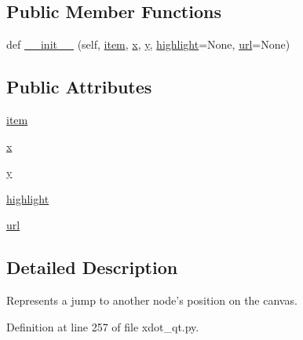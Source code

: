 \subsection*{Public Member Functions}
\begin{DoxyCompactItemize}
\item 
def \hyperlink{classsmacc__viewer_1_1xdot_1_1xdot__qt_1_1Jump_ad88ca98883d1fca0780fca9c5964c081}{\+\_\+\+\_\+init\+\_\+\+\_\+} (self, \hyperlink{classsmacc__viewer_1_1xdot_1_1xdot__qt_1_1Jump_a1bc47eb940a7b69fab6a896feba4942b}{item}, \hyperlink{classsmacc__viewer_1_1xdot_1_1xdot__qt_1_1Jump_a165dd6595f012b5dfaa5a9e72891313c}{x}, \hyperlink{classsmacc__viewer_1_1xdot_1_1xdot__qt_1_1Jump_a356d84d9e4adf445957ca3f65860af0e}{y}, \hyperlink{classsmacc__viewer_1_1xdot_1_1xdot__qt_1_1Jump_ad50593e5405bad8b183914fe0b7ce965}{highlight}=None, \hyperlink{classsmacc__viewer_1_1xdot_1_1xdot__qt_1_1Jump_a7261b2ea95bf08591a454101dc96ebdb}{url}=None)
\end{DoxyCompactItemize}
\subsection*{Public Attributes}
\begin{DoxyCompactItemize}
\item 
\hyperlink{classsmacc__viewer_1_1xdot_1_1xdot__qt_1_1Jump_a1bc47eb940a7b69fab6a896feba4942b}{item}
\item 
\hyperlink{classsmacc__viewer_1_1xdot_1_1xdot__qt_1_1Jump_a165dd6595f012b5dfaa5a9e72891313c}{x}
\item 
\hyperlink{classsmacc__viewer_1_1xdot_1_1xdot__qt_1_1Jump_a356d84d9e4adf445957ca3f65860af0e}{y}
\item 
\hyperlink{classsmacc__viewer_1_1xdot_1_1xdot__qt_1_1Jump_ad50593e5405bad8b183914fe0b7ce965}{highlight}
\item 
\hyperlink{classsmacc__viewer_1_1xdot_1_1xdot__qt_1_1Jump_a7261b2ea95bf08591a454101dc96ebdb}{url}
\end{DoxyCompactItemize}


\subsection{Detailed Description}
\begin{DoxyVerb}Represents a jump to another node's position on the canvas.\end{DoxyVerb}
 

Definition at line 257 of file xdot\+\_\+qt.\+py.



